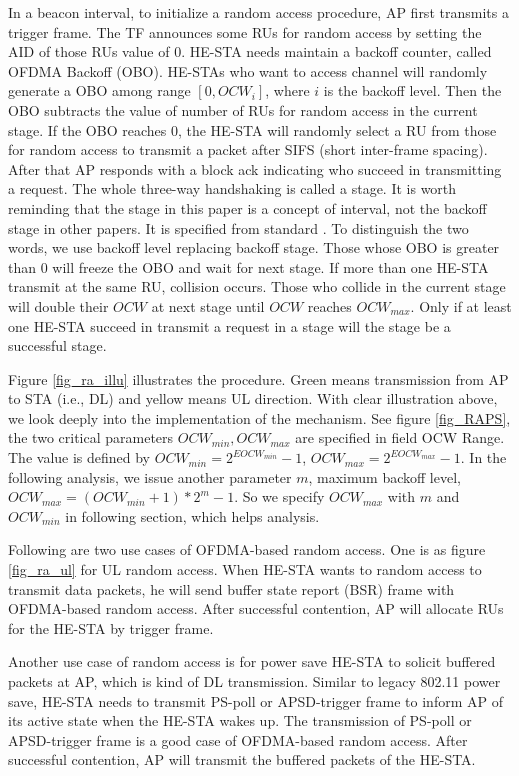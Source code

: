 In a beacon interval, to initialize a random access procedure, AP first transmits a trigger frame. 
The TF announces some RUs for random access by setting the AID of those RUs value of 0. 
HE-STA needs maintain a backoff counter, called OFDMA Backoff (OBO). 
HE-STAs who want to access channel will randomly generate a OBO among range $[0, OCW_i]$, where $i$ is the backoff level. 
Then the OBO subtracts the value of number of RUs for random access in the current stage. 
If the OBO reaches 0, the HE-STA will randomly select a RU from those for random access to transmit a packet after SIFS (short inter-frame spacing). 
After that AP responds with a block ack indicating who succeed in transmitting a request. The whole three-way handshaking is called a stage. 
It is worth reminding that the stage in this paper is a concept of interval, not the backoff stage in other papers. 
It is specified from standard \cite{draft_ax}. To distinguish the two words, we use backoff level replacing backoff stage. 
Those whose OBO is greater than 0 will freeze the OBO and wait for next stage.  
If more than one HE-STA transmit at the same RU, collision occurs. 
Those who collide in the current stage will double their $OCW$ at next stage until $OCW$ reaches $OCW_{max}$. 
Only if at least one HE-STA succeed in transmit a request in a stage will the stage be a successful stage. 

Figure \ref{fig_ra_illu} illustrates the procedure. Green means transmission from AP to STA (i.e., DL) and yellow means UL direction. 
With clear illustration above, we look deeply into the implementation of the mechanism.
See figure \ref{fig_RAPS}, the two critical parameters $OCW_{min},OCW_{max}$ are specified in field OCW Range. 
The value is defined by $OCW_{min} = 2^{EOCW_{min}}-1$, $OCW_{max} = 2^{EOCW_{max}}-1$. 
In the following analysis, we issue another parameter $m$, maximum backoff level, $OCW_{max} = (OCW_{min}+1)*2^m-1$. So we specify $OCW_{max}$ with $m$ and $OCW_{min}$ in following section, which helps analysis.


Following are two use cases of OFDMA-based random access. 
One is as figure \ref{fig_ra_ul} for UL random access. 
When HE-STA wants to random access to transmit data packets, he will send buffer state report (BSR) frame with OFDMA-based random access. 
After successful contention, AP will allocate RUs for the HE-STA by trigger frame. 


Another use case of random access is for power save HE-STA to solicit buffered packets at AP, which is kind of DL transmission.
Similar to legacy 802.11 power save, HE-STA needs to transmit PS-poll or APSD-trigger frame to inform AP of its active state when the HE-STA wakes up.
The transmission of PS-poll or APSD-trigger frame is a good case of OFDMA-based random access. After successful contention, AP will transmit the buffered packets of the HE-STA.


